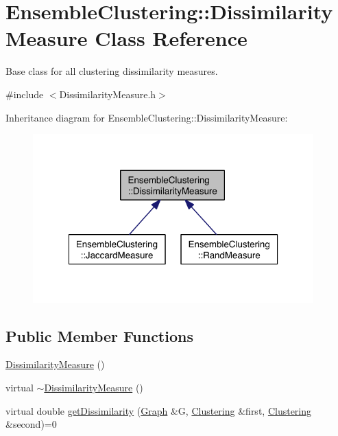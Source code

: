 \hypertarget{class_ensemble_clustering_1_1_dissimilarity_measure}{\section{Ensemble\-Clustering\-:\-:Dissimilarity\-Measure Class Reference}
\label{class_ensemble_clustering_1_1_dissimilarity_measure}
}


Base class for all clustering dissimilarity measures.  




{\ttfamily \#include $<$Dissimilarity\-Measure.\-h$>$}



Inheritance diagram for Ensemble\-Clustering\-:\-:Dissimilarity\-Measure\-:
\nopagebreak
\begin{figure}[H]
\begin{center}
\leavevmode
\includegraphics[width=307pt]{class_ensemble_clustering_1_1_dissimilarity_measure__inherit__graph}
\end{center}
\end{figure}
\subsection*{Public Member Functions}
\begin{DoxyCompactItemize}
\item 
\hyperlink{class_ensemble_clustering_1_1_dissimilarity_measure_a4ebbe3597c998cac01c636b3626827f2}{Dissimilarity\-Measure} ()
\item 
virtual \hyperlink{class_ensemble_clustering_1_1_dissimilarity_measure_aac2cc0b360f3cfc8a8f7c980b34e9f98}{$\sim$\-Dissimilarity\-Measure} ()
\item 
virtual double \hyperlink{class_ensemble_clustering_1_1_dissimilarity_measure_a6f31820f03484498a9b613357adbafd1}{get\-Dissimilarity} (\hyperlink{class_ensemble_clustering_1_1_graph}{Graph} \&G, \hyperlink{class_ensemble_clustering_1_1_clustering}{Clustering} \&first, \hyperlink{class_ensemble_clustering_1_1_clustering}{Clustering} \&second)=0
\end{DoxyCompactItemize}



